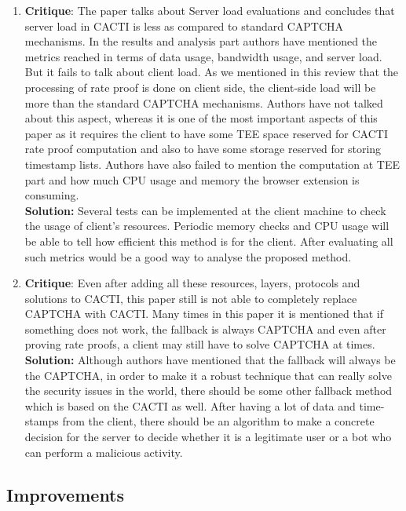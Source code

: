\begin{enumerate}

	\item\textbf{Critique}: The paper talks about Server load evaluations and concludes that server load in CACTI is less as compared to standard CAPTCHA mechanisms. In the results and analysis part authors have mentioned the metrics reached in terms of data usage, bandwidth usage, and server load. But it fails to talk about client load. As we mentioned in this review that the processing of rate proof is done on client side, the client-side load will be more than the standard CAPTCHA mechanisms. Authors have not talked about this aspect, whereas it is one of the most important aspects of this paper as it requires the client to have some TEE space reserved for CACTI rate proof computation and also to have some storage reserved for storing timestamp lists. Authors have also failed to mention the computation at TEE part and how much CPU usage and memory the browser extension is consuming.\\

	\textbf{Solution:} Several tests can be implemented at the client machine to check the usage of client's resources. Periodic memory checks and CPU usage will be able to tell how efficient this method is for the client. After evaluating all such metrics would be a good way to analyse the proposed method.\\

	\item \textbf{Critique}: Even after adding all these resources, layers, protocols and solutions to CACTI, this paper still is not able to completely replace CAPTCHA with CACTI. Many times in this paper it is mentioned that if something does not work, the fallback is always CAPTCHA and even after proving rate proofs, a client may still have to solve CAPTCHA at times.\\

	\textbf{Solution:} Although authors have mentioned that the fallback will always be the CAPTCHA, in order to make it a robust technique that can really solve the security issues in the world, there should be some other fallback method which is based on the CACTI as well. After having a lot of data and time-stamps from the client, there should be an algorithm to make a concrete decision for the server to decide whether it is a legitimate user or a bot who can perform a malicious activity.

\end{enumerate}


\subsection{Improvements}